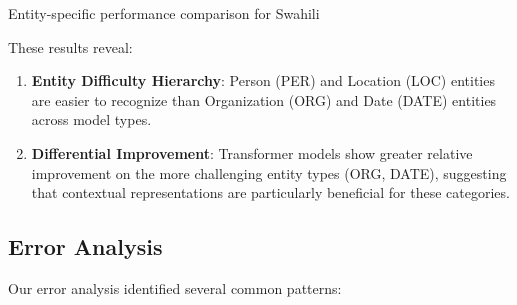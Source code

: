 \documentclass[
]{article}
\begin{document}
Entity-specific performance comparison for Swahili

These results reveal:

\begin{enumerate}
\def\labelenumi{\arabic{enumi}.}
\item
  \textbf{Entity Difficulty Hierarchy}: Person (PER) and Location (LOC)
  entities are easier to recognize than Organization (ORG) and Date
  (DATE) entities across model types.
\item
  \textbf{Differential Improvement}: Transformer models show greater
  relative improvement on the more challenging entity types (ORG, DATE),
  suggesting that contextual representations are particularly beneficial
  for these categories.
\end{enumerate}

\subsection{Error Analysis}\label{error-analysis}

Our error analysis identified several common patterns:
\end{document}
